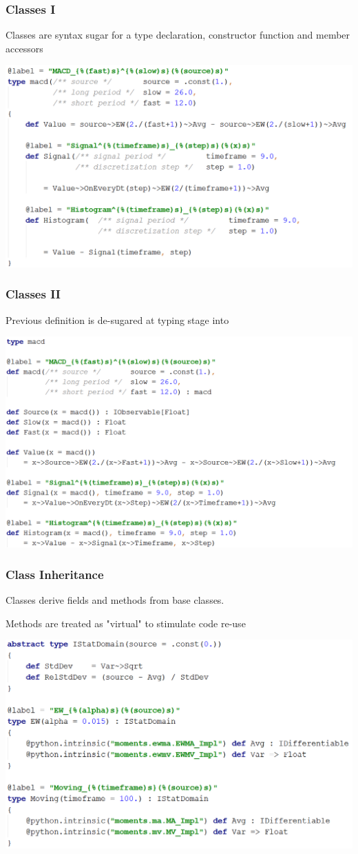 \documentclass{beamer}
\begin{document}
\begin{frame}
\frametitle{Classes I}
Classes are syntax sugar for a type declaration, constructor function and member accessors

\includegraphics[width=1\linewidth]{macd.png}

\end{frame}
\begin{frame}
\frametitle{Classes II}
Previous definition is de-sugared at typing stage into

\includegraphics[width=1\linewidth]{macd_desugared.png}
\end{frame}
\begin{frame}
\frametitle{Class Inheritance}
Classes derive fields and methods from base classes.

Methods are treated as "virtual" to stimulate code re-use

\includegraphics[width=1\linewidth]{moments.png}
\end{frame}
\end{document}
